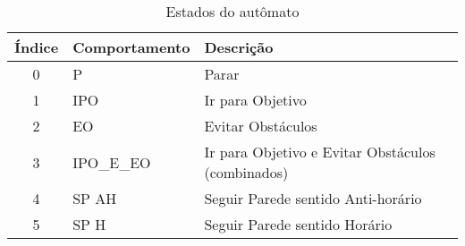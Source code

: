 \begin{table}[ht]
\centering
\caption{Estados do autômato}
\vspace{0.2 cm}
\begin{tabular}{|c|l|l|}
\hline
Índice & Comportamento & Descrição                                         \\ \hline
0      & P             & Parar                                             \\ \hline
1      & IPO           & Ir para Objetivo                                  \\ \hline
2      & EO            & Evitar Obstáculos                                 \\ \hline
3      & IPO\_E\_EO    & Ir para Objetivo e Evitar Obstáculos (combinados) \\ \hline
4      & SP AH         & Seguir Parede sentido Anti-horário				   \\ \hline
5      & SP H          & Seguir Parede sentido Horário                     \\ \hline
\end{tabular}
\label{tab:automatoEstados}
\end{table}